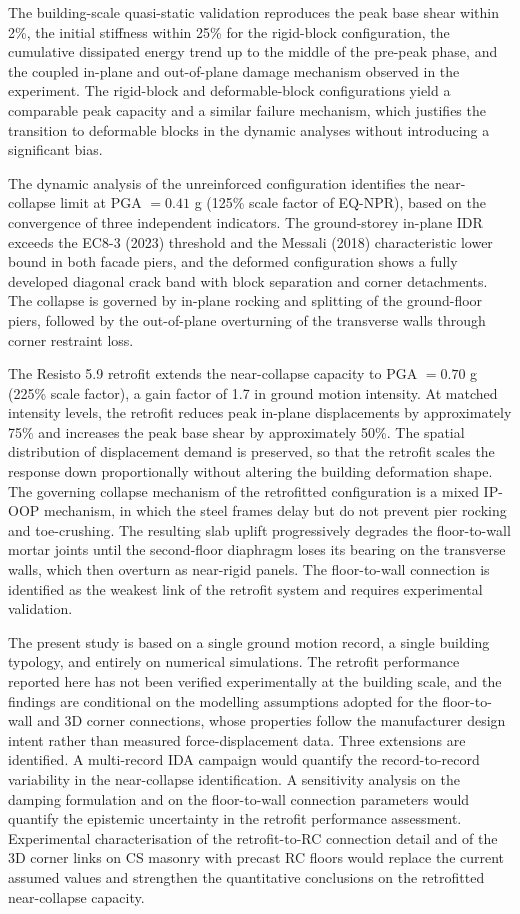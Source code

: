 \documentclass[AMA,twocolumn]{USG} %
\begin{document}
The building-scale quasi-static validation reproduces the peak base shear within 2\%, the initial stiffness within 25\% for the rigid-block configuration, the cumulative dissipated energy trend up to the middle of the pre-peak phase, and the coupled in-plane and out-of-plane damage mechanism observed in the experiment. The rigid-block and deformable-block configurations yield a comparable peak capacity and a similar failure mechanism, which justifies the transition to deformable blocks in the dynamic analyses without introducing a significant bias.
 
The dynamic analysis of the unreinforced configuration identifies the near-collapse limit at PGA $= 0.41$ g (125\% scale factor of EQ-NPR), based on the convergence of three independent indicators. The ground-storey in-plane IDR exceeds the EC8-3 (2023) threshold and the Messali (2018) characteristic lower bound in both facade piers, and the deformed configuration shows a fully developed diagonal crack band with block separation and corner detachments. The collapse is governed by in-plane rocking and splitting of the ground-floor piers, followed by the out-of-plane overturning of the transverse walls through corner restraint loss.
 
The Resisto 5.9 retrofit extends the near-collapse capacity to PGA $= 0.70$ g (225\% scale factor), a gain factor of 1.7 in ground motion intensity. At matched intensity levels, the retrofit reduces peak in-plane displacements by approximately 75\% and increases the peak base shear by approximately 50\%. The spatial distribution of displacement demand is preserved, so that the retrofit scales the response down proportionally without altering the building deformation shape. The governing collapse mechanism of the retrofitted configuration is a mixed IP-OOP mechanism, in which the steel frames delay but do not prevent pier rocking and toe-crushing. The resulting slab uplift progressively degrades the floor-to-wall mortar joints until the second-floor diaphragm loses its bearing on the transverse walls, which then overturn as near-rigid panels. The floor-to-wall connection is identified as the weakest link of the retrofit system and requires experimental validation.
 
The present study is based on a single ground motion record, a single building typology, and entirely on numerical simulations. The retrofit performance reported here has not been verified experimentally at the building scale, and the findings are conditional on the modelling assumptions adopted for the floor-to-wall and 3D corner connections, whose properties follow the manufacturer design intent rather than measured force-displacement data. Three extensions are identified. A multi-record IDA campaign would quantify the record-to-record variability in the near-collapse identification. A sensitivity analysis on the damping formulation and on the floor-to-wall connection parameters would quantify the epistemic uncertainty in the retrofit performance assessment. Experimental characterisation of the retrofit-to-RC connection detail and of the 3D corner links on CS masonry with precast RC floors would replace the current assumed values and strengthen the quantitative conclusions on the retrofitted near-collapse capacity.
\end{document}
